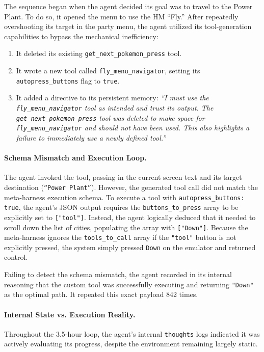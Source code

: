 \documentclass[11pt]{article}
\begin{document}
The sequence began when the agent decided its goal was to travel to the Power Plant. To do so, it opened the menu to use the HM ``Fly.'' After repeatedly overshooting its target in the party menu, the agent utilized its tool-generation capabilities to bypass the mechanical inefficiency:
\begin{enumerate}
    \item It deleted its existing \texttt{get\_next\_pokemon\_press} tool.
    \item It wrote a new tool called \texttt{fly\_menu\_navigator}, setting its \texttt{autopress\_buttons} flag to \texttt{true}.
    \item It added a directive to its persistent memory: \emph{``I must use the \texttt{fly\_menu\_navigator} tool as intended and trust its output. The \texttt{get\_next\_pokemon\_press} tool was deleted to make space for \texttt{fly\_menu\_navigator} and should not have been used. This also highlights a failure to immediately use a newly defined tool.''}
\end{enumerate}

\paragraph{Schema Mismatch and Execution Loop.} The agent invoked the tool, passing in the current screen text and its target destination (\texttt{``Power Plant''}). However, the generated tool call did not match the meta-harness execution schema. To execute a tool with \texttt{autopress\_buttons: true}, the agent's JSON output requires the \texttt{buttons\_to\_press} array to be explicitly set to \texttt{["tool"]}. Instead, the agent logically deduced that it needed to scroll down the list of cities, populating the array with \texttt{["Down"]}. Because the meta-harness ignores the \texttt{tools\_to\_call} array if the \texttt{"tool"} button is not explicitly pressed, the system simply pressed \texttt{Down} on the emulator and returned control.

Failing to detect the schema mismatch, the agent recorded in its internal reasoning that the custom tool was successfully executing and returning \texttt{"Down"} as the optimal path. It repeated this exact payload 842 times.

\paragraph{Internal State vs. Execution Reality.} Throughout the 3.5-hour loop, the agent's internal \texttt{thoughts} logs indicated it was actively evaluating its progress, despite the environment remaining largely static.
\end{document}
